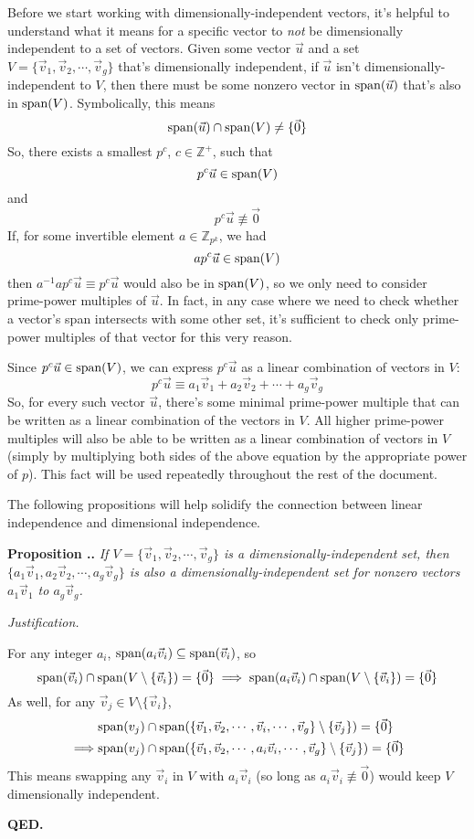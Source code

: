 \documentclass[a4paper, 12pt, reqno]{amsart}
\newcommand\vecspan[1]{\textup{span}(#1)}
\newcounter{propcounter}[section]
\newenvironment{proposition}[1]
{
	\refstepcounter{propcounter}
	\textbf{Proposition \thesection.\thepropcounter.} \emph{#1}
	
	\emph{Justification.}
}
{
	\textbf{QED.} \\
}
\begin{document}
		Before we start working with dimensionally-independent vectors, it's helpful to understand what it means for a specific vector to \emph{not} be dimensionally
		independent to a set of vectors. Given some vector $\vec{u}$ and a set $V = \{\vec{v}_1, \vec{v}_2, \cdots, \vec{v}_g\}$ that's dimensionally independent, if 
		$\vec{u}$ isn't dimensionally-independent to $V$, then there must be some nonzero vector in $\vecspan{\vec{u}}$ that's also in $\vecspan{V}$. Symbolically, this
		means
		\[
			\vecspan{\vec{u}} \cap \vecspan{V} \neq \{\vec{0}\}
		\]
		So, there exists a smallest $p^c$, $c \in \mathds{Z}^+$, such that
		\[
			p^c\vec{u} \in \vecspan{V}
		\]
		and
		\[
			p^c\vec{u} \not\equiv \vec{0}
		\]
		If, for some invertible element $a \in \mathds{Z}_{p^k}$, we had
		\[
			ap^c\vec{u} \in \vecspan{V}
		\]
		then $a^{-1}ap^c\vec{u} \equiv p^c\vec{u}$ would also be in $\vecspan{V}$, so we only need to consider prime-power multiples of $\vec{u}$. In fact, in any case 
		where we need to check whether a vector's span intersects with some other set, it's sufficient to check only prime-power multiples of that vector for this very 
		reason. 
		
		Since $p^c\vec{u} \in \vecspan{V}$, we can express $p^c\vec{u}$ as a linear combination of vectors in $V$:
		\[
			p^c\vec{u} \equiv a_1\vec{v}_1 + a_2\vec{v}_2 + \cdots + a_g\vec{v}_g
		\]
		So, for every such vector $\vec{u}$, there's some minimal prime-power multiple that can be written as a linear combination of the vectors in $V$. All higher 
		prime-power multiples will also be able to be written as a linear combination of vectors in $V$ (simply by multiplying both sides of the above equation by the
		appropriate power of $p$). This fact will be used repeatedly throughout the rest of the document.
		
		The following propositions will help solidify the connection between linear independence and dimensional independence.
		
		\begin{proposition}{If $V = \{\vec{v}_1, \vec{v}_2, \cdots, \vec{v}_g\}$ is a dimensionally-independent set, then 
		$\{a_1\vec{v}_1, a_2\vec{v}_2, \cdots, a_g\vec{v}_g\}$ is also a dimensionally-independent set for nonzero vectors $a_1\vec{v}_1$ to $a_g\vec{v}_g$.}
			\label{prop:DImultset}
			For any integer $a_i$, $\vecspan{a_i\vec{v}_i} \subseteq \vecspan{\vec{v}_i}$, so
			\[
				\vecspan{\vec{v}_i} \cap \vecspan{V \setminus \{\vec{v}_i\}} = \{\vec{0}\} \implies
				\vecspan{a_i\vec{v}_i} \cap \vecspan{V \setminus \{\vec{v}_i\}} = \{\vec{0}\}
			\]
			As well, for any $\vec{v}_j \in V \setminus \{\vec{v}_i\}$,
			\begin{align*}
				& \vecspan{v_j} \cap \vecspan{\{\vec{v}_1, \vec{v}_2, \cdots, \vec{v}_i, \cdots, \vec{v}_g\} \setminus \{\vec{v}_j\}} = \{\vec{0}\} \\
				\implies & 
				\vecspan{v_j} \cap \vecspan{\{\vec{v}_1, \vec{v}_2, \cdots, a_i\vec{v}_i, \cdots, \vec{v}_g\} \setminus \{\vec{v}_j\}} = \{\vec{0}\}
			\end{align*}
			This means swapping any $\vec{v}_i$ in $V$ with $a_i\vec{v}_i$ (so long as $a_i\vec{v}_i \not\equiv \vec{0}$) would keep $V$ dimensionally independent.
		\end{proposition}
		
\end{document}
